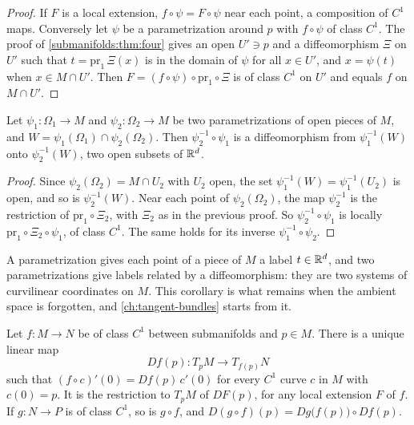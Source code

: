 \begin{notechapter}
\begin{proof}
If $F$ is a local extension, $f\circ\psi = F\circ\psi$ near each point,
a composition of $C^1$ maps. Conversely let $\psi$ be a parametrization
around $p$ with $f\circ\psi$ of class $C^1$. The proof of
\cref{submanifolds:thm:four} gives an open $U'\ni p$ and a diffeomorphism
$\Xi$ on $U'$ such that $t = \mathrm{pr}_1\,\Xi(x)$ is in the domain of
$\psi$ for all $x\in U'$, and $x = \psi(t)$ when $x\in M\cap U'$. Then
$F = (f\circ\psi)\circ\mathrm{pr}_1\circ\Xi$ is of class $C^1$ on $U'$
and equals $f$ on $M\cap U'$.
\end{proof}

\begin{corollary}\label{submanifolds:cor:transition}
Let $\psi_1:\Omega_1\to M$ and $\psi_2:\Omega_2\to M$ be two
parametrizations of open pieces of $M$, and
$W = \psi_1(\Omega_1)\cap\psi_2(\Omega_2)$. Then
$\psi_2^{-1}\circ\psi_1$ is a diffeomorphism from $\psi_1^{-1}(W)$ onto
$\psi_2^{-1}(W)$, two open subsets of $\mathbb{R}^d$.
\end{corollary}

\begin{proof}
Since $\psi_2(\Omega_2) = M\cap U_2$ with $U_2$ open, the set
$\psi_1^{-1}(W) = \psi_1^{-1}(U_2)$ is open, and so is $\psi_2^{-1}(W)$.
Near each point of $\psi_2(\Omega_2)$, the map $\psi_2^{-1}$ is the
restriction of $\mathrm{pr}_1\circ\Xi_2$, with $\Xi_2$ as in the previous
proof. So $\psi_2^{-1}\circ\psi_1$ is locally
$\mathrm{pr}_1\circ\Xi_2\circ\psi_1$, of class $C^1$. The same holds for
its inverse $\psi_1^{-1}\circ\psi_2$.
\end{proof}

A parametrization gives each point of a piece of $M$ a label $t\in\mathbb{R}^d$,
and two parametrizations give labels related by a diffeomorphism: they
are two systems of curvilinear coordinates on $M$. This corollary is what
remains when the ambient space is forgotten, and
\cref{ch:tangent-bundles} starts from it.

\begin{proposition}\label{submanifolds:prop:differential}
Let $f:M\to N$ be of class $C^1$ between submanifolds and $p\in M$. There
is a unique linear map
\[
  Df(p):T_pM\to T_{f(p)}N
\]
such that $(f\circ c)'(0) = Df(p)\,c'(0)$ for every $C^1$ curve $c$ in
$M$ with $c(0) = p$. It is the restriction to $T_pM$ of $DF(p)$, for any
local extension $F$ of $f$. If $g:N\to P$ is of class $C^1$, so is
$g\circ f$, and
$D(g\circ f)(p) = Dg\bigl(f(p)\bigr)\circ Df(p)$.
\end{proposition}


\end{notechapter}
